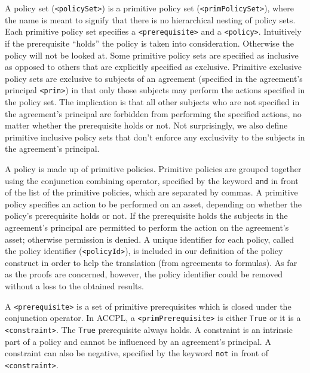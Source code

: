 \documentclass[conference]{IEEEtran}
\newcommand{\syn}{\texttt}
\begin{document}
A policy set (\syn{<policySet>}) is a primitive policy set
(\syn{<primPolicySet>}), where the name is meant to signify that there
is no hierarchical nesting of policy sets. Each primitive policy set
specifies a \syn{<prerequisite>} and a \syn{<policy>}. Intuitively if
the prerequisite ``holds'' the policy is taken into
consideration. Otherwise the policy will not be looked at. Some
primitive policy sets are specified as inclusive as opposed to others
that are explicitly specified as exclusive. Primitive exclusive policy
sets are exclusive to subjects of an agreement (specified in the agreement's principal \syn{<prin>}) in that only those subjects
may perform the actions specified in the policy set. The implication
is that all other subjects who are not specified in the agreement's
principal are forbidden from performing the specified actions, no
matter whether the prerequisite holds or not. Not surprisingly, we also
define primitive inclusive policy sets that don't enforce any
exclusivity to the subjects in the agreement's principal.

A policy is made up of primitive policies. Primitive policies are
grouped together using the conjunction combining operator, specified
by the keyword \syn{and} in front of the list of the primitive
policies, which are separated by commas. A primitive policy specifies
an action to be performed on an asset, depending on whether the
policy's prerequisite holds or not. If the prerequisite holds the subjects in the
agreement's principal are permitted to perform the action on the agreement's
asset; otherwise permission is denied. A unique identifier for each
policy, called the policy identifier (\syn{<policyId>}), is included
in our definition of the policy construct in order to help the
translation (from agreements to formulas). As far as the proofs are
concerned, however, the policy identifier could be removed without a
loss to the obtained results.

A \syn{<prerequisite>} is a set of primitive prerequisites which is
closed under the conjunction operator. In \ac{ACCPL}, a
\syn{<primPrerequisite>} is either \syn{True} or it is a
\syn{<constraint>}. The \syn{True} prerequisite always holds. A
constraint is an intrinsic part of a policy and cannot be influenced
by an agreement's principal. A constraint can also be negative, specified
by the keyword \syn{not} in front of \syn{<constraint>}.
\end{document}
